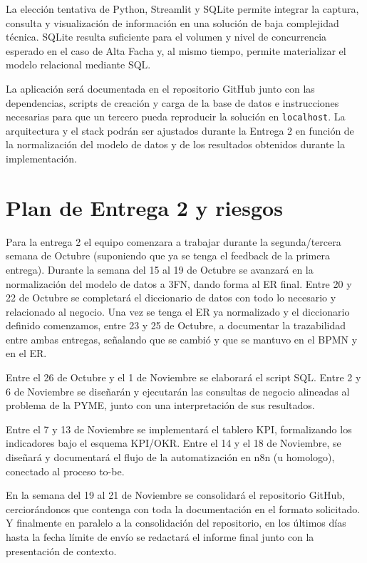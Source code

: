 \documentclass[11pt,letterpaper]{article}
\begin{document}
La elección tentativa de Python, Streamlit y SQLite permite integrar la captura, consulta 
y visualización de información en una solución de baja complejidad técnica. SQLite 
resulta suficiente para el volumen y nivel de concurrencia esperado en el caso de Alta 
Facha y, al mismo tiempo, permite materializar el modelo relacional mediante SQL.

La aplicación será documentada en el repositorio GitHub junto con las dependencias, 
scripts de creación y carga de la base de datos e instrucciones necesarias para que un 
tercero pueda reproducir la solución en \texttt{localhost}. La arquitectura y el stack 
podrán ser ajustados durante la Entrega 2 en función de la normalización del modelo de 
datos y de los resultados obtenidos durante la implementación.

\section{Plan de Entrega 2 y riesgos}
Para la entrega 2 el equipo comenzara a trabajar durante la segunda/tercera semana de Octubre (suponiendo que ya se tenga el feedback de la primera entrega). Durante la semana del 15 al 19 de Octubre se avanzará en la normalización del modelo de datos a 3FN, dando forma al ER final. Entre 20 y 22 de Octubre se completará el diccionario de datos con todo lo necesario y relacionado al negocio. Una vez se tenga el ER ya normalizado y el diccionario definido comenzamos, entre 23 y 25 de Octubre, a documentar la trazabilidad entre ambas entregas, señalando que se cambió y que se mantuvo en el BPMN y en el ER.

Entre el 26 de Octubre y el 1 de Noviembre se elaborará el script SQL. Entre 2 y 6 de Noviembre se diseñarán y ejecutarán las consultas de negocio alineadas al problema de la PYME, junto con una interpretación de sus resultados.

Entre el 7 y 13 de Noviembre se implementará el tablero KPI, formalizando los indicadores bajo el esquema KPI/OKR. Entre el 14 y el 18 de Noviembre, se diseñará y documentará el flujo de la automatización en n8n (u homologo), conectado al proceso to-be.

En la semana del 19 al 21 de Noviembre se consolidará el repositorio GitHub, cerciorándonos que contenga con toda la documentación en el formato solicitado. Y finalmente en paralelo a la consolidación del repositorio, en los últimos días hasta la fecha límite de envío se redactará el informe final junto con la presentación de contexto.
\end{document}
